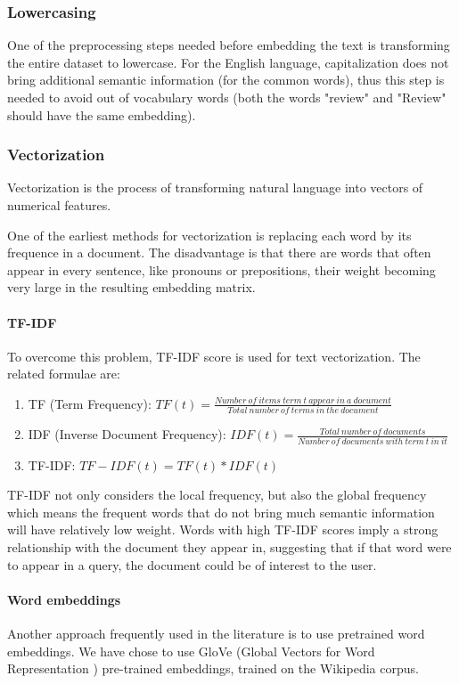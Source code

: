 \subsubsection{Lowercasing}
One of the preprocessing steps needed before embedding the text is transforming the entire dataset to lowercase. For the English language, capitalization does not bring additional semantic information (for the common words), thus this step is needed to avoid out of vocabulary words (both the words "review" and "Review" should have the same embedding).

\subsubsection{Vectorization}
Vectorization is the process of transforming natural language into vectors of numerical features.

One of the earliest methods for vectorization is replacing each word by its frequence in a document. The disadvantage is that there are words that often appear in every sentence, like pronouns or prepositions, their weight becoming very large in the resulting embedding matrix.
\paragraph{TF-IDF}\label{tfidf}
To overcome this problem, TF-IDF score is used for text vectorization. The related formulae are:
\begin{enumerate}
    \item TF (Term Frequency):
    $TF(t)=\frac{Number\ of\ items\ term\ t\ appear\ in\ a\ document}{Total\ number\ of\ terms\ in\ the\ document}$
    \item IDF (Inverse Document Frequency):
    $IDF(t)=\frac{Total\ number\ of\ documents}{Number\ of\ documents\ with\ term\ t\ in\ it}$
    \item TF-IDF:
    $TF-IDF(t)=TF(t)*IDF(t)$
\end{enumerate}
TF-IDF not only considers the local frequency, but also the global frequency which means the frequent words that do not bring much semantic information will have relatively low weight. Words with high TF-IDF scores imply a strong relationship with the document they appear in, suggesting that if that word were to appear in a query, the document could be of interest to the user.\cite{lehmer1919}

\paragraph{Word embeddings}
Another approach frequently used in the literature is to use pretrained word embeddings. We have chose to use GloVe (Global Vectors for Word Representation \cite{glove}) pre-trained embeddings, trained on the Wikipedia corpus.